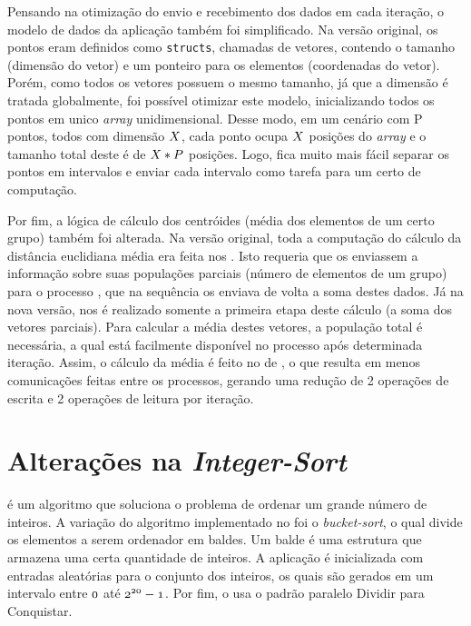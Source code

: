 Pensando na otimização do envio e recebimento dos dados em cada iteração, o modelo de dados da aplicação também foi simplificado. Na versão original, os pontos eram definidos como \texttt{structs}, chamadas de vetores, contendo o tamanho (dimensão do vetor) e um ponteiro para os elementos (coordenadas do vetor). Porém, como todos os vetores possuem o mesmo tamanho, já que a dimensão é tratada globalmente, foi possível otimizar este modelo, inicializando todos os pontos em unico \textit{array} unidimensional. Desse modo, em um cenário com P pontos, todos com dimensão $\mathnormal{X}$, cada ponto ocupa $\mathnormal{X}$ posições do \textit{array} e o tamanho total deste é de $\mathnormal{X * P}$ posições. Logo, fica muito mais fácil separar os pontos em intervalos e enviar cada intervalo como tarefa para um certo \cluster de computação.

Por fim, a lógica de cálculo dos centróides (média dos elementos de um certo grupo) também foi alterada. Na versão original, toda a computação do cálculo da distância euclidiana média era feita nos \CCs. Isto requeria que os \CCs enviassem a informação sobre suas populações parciais (número de elementos de um grupo) para o processo \master, que na sequência os enviava de volta a soma destes dados. Já na nova versão, nos \CCs é realizado somente a primeira etapa deste cálculo (a soma dos vetores parciais). Para calcular a média destes vetores, a população total é necessária, a qual está facilmente disponível no processo \master após determinada iteração. Assim, o cálculo da média é feito no \cluster de \IO, o que resulta em menos comunicações feitas entre os processos, gerando uma redução de 2 operações de escrita e 2 operações de leitura por iteração.

\section{Alterações na \textit{Integer-Sort}}
\label{sec:alteracoesis}

\textit{\IS} é um algoritmo que soluciona o problema de ordenar um grande número de inteiros. A variação do algoritmo implementado no \capb foi o \textit{bucket-sort}, o qual divide os elementos a serem ordenador em baldes. Um balde é uma estrutura que armazena uma certa quantidade de inteiros. A aplicação é inicializada com entradas aleatórias para o conjunto dos inteiros, os quais são gerados em um intervalo entre $\mathnormal{0}$ até $\mathnormal{2^{20} - 1}$. Por fim, o \IS usa o padrão paralelo Dividir para Conquistar.

